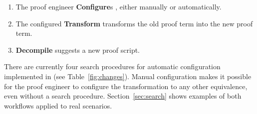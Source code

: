 \begin{enumerate}
\item The proof engineer \textbf{Configure}s \toolname, either manually or automatically.
\item The configured \textbf{Transform} transforms the old proof term into the new proof term.
\item \textbf{Decompile} suggests a new proof script. %
\end{enumerate}

There are currently four search procedures for automatic configuration implemented in \toolname (see Table~\ref{fig:changes}).
Manual configuration makes it possible
for the proof engineer to configure the transformation to any other equivalence,
even without a search procedure.
Section~\ref{sec:search} shows examples of both workflows applied to real scenarios.


